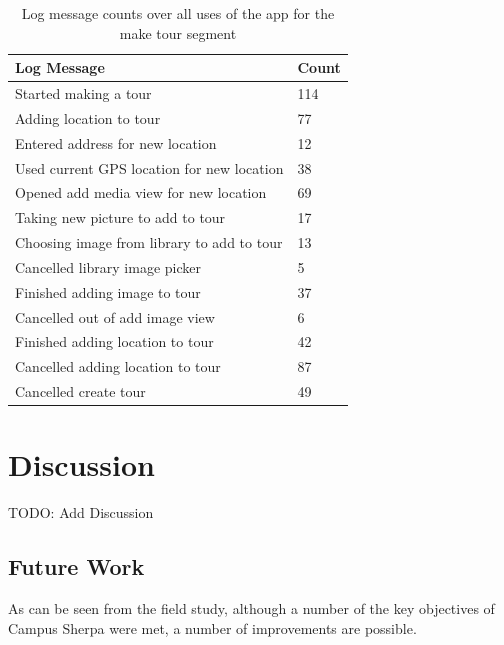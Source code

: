 \documentclass{sigchi}
\begin{document}
\begin{table}
\begin{tabular}{|l|l|}\hline
\textbf{Log Message} & \textbf{Count} \\ \hline
 Started making a tour & 114 \\ \hline
 Adding location to tour & 77 \\ \hline
 Entered address for new location & 12 \\ \hline
 Used current GPS location for new location & 38 \\ \hline
 Opened add media view for new location & 69 \\ \hline
 Taking new picture to add to tour & 17 \\ \hline
 Choosing image from library to add to tour & 13 \\ \hline
 Cancelled library image picker & 5 \\ \hline
 Finished adding image to tour & 37 \\ \hline
 Cancelled out of add image view & 6 \\ \hline
 Finished adding location to tour & 42 \\ \hline
 Cancelled adding location to tour & 87 \\ \hline
 Cancelled create tour & 49 \\ \hline
\end{tabular}
\caption{Log message counts over all uses of the app for the make tour segment}
\label{logging-results-make}
\end{table}

\section{Discussion}

TODO: Add Discussion

\subsection{Future Work}

As can be seen from the field study, although a number of the key objectives of Campus Sherpa were met, a number of improvements are possible. 
\end{document}
